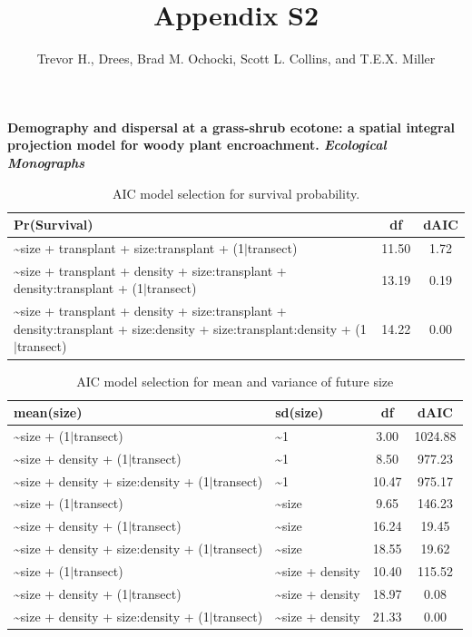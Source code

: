 \documentclass[11pt]{article}\usepackage[]{graphicx}\usepackage[usenames,dvipsnames]{xcolor}
\title{Appendix S2}
\author{Trevor H., Drees, Brad M. Ochocki, Scott L. Collins, and T.E.X. Miller}
\date{\vspace{-5ex}}
\begin{document}
\maketitle
\noindent{} \textbf{Demography and dispersal at a grass-shrub ecotone: a spatial integral projection model for woody plant encroachment. \textit{Ecological Monographs}}

\renewcommand{\thefigure}{S\arabic{figure}}\setcounter{figure}{0}
\renewcommand{\thetable}{S\arabic{table}}\setcounter{table}{0}
\renewcommand{\theequation}{S\arabic{equation}}\setcounter{equation}{0}

\begin{table}[ht]
\centering
\begin{tabular}{|p{12cm}|c|c|}
  \hline
Pr(Survival) & df & dAIC \\ 
  \hline
\~{}size + transplant + size:transplant + (1$|$transect) & 11.50 & 1.72 \\ 
  \~{}size + transplant + density + size:transplant + density:transplant + (1$|$transect) & 13.19 & 0.19 \\ 
  \~{}size + transplant + density + size:transplant + density:transplant + size:density + size:transplant:density + (1$|$transect) & 14.22 & 0.00 \\ 
   \hline
\end{tabular}
\caption{AIC model selection for survival probability.} 
\label{tab:surv_aic}
\end{table}


\begin{table}[ht]
\centering
\begin{tabular}{|p{8cm}|p{4cm}|c|c|}
  \hline
mean(size) & sd(size) & df & dAIC \\ 
  \hline
\~{}size + (1$|$transect) & \~{}1 & 3.00 & 1024.88 \\ 
  \~{}size + density + (1$|$transect) & \~{}1 & 8.50 & 977.23 \\ 
  \~{}size + density + size:density + (1$|$transect) & \~{}1 & 10.47 & 975.17 \\ 
  \~{}size + (1$|$transect) & \~{}size & 9.65 & 146.23 \\ 
  \~{}size + density + (1$|$transect) & \~{}size & 16.24 & 19.45 \\ 
  \~{}size + density + size:density + (1$|$transect) & \~{}size & 18.55 & 19.62 \\ 
  \~{}size + (1$|$transect) & \~{}size + density & 10.40 & 115.52 \\ 
  \~{}size + density + (1$|$transect) & \~{}size + density & 18.97 & 0.08 \\ 
  \~{}size + density + size:density + (1$|$transect) & \~{}size + density & 21.33 & 0.00 \\ 
   \hline
\end{tabular}
\caption{AIC model selection for mean and variance of future size} 
\label{tab:grow_aic}
\end{table}
\end{document}
